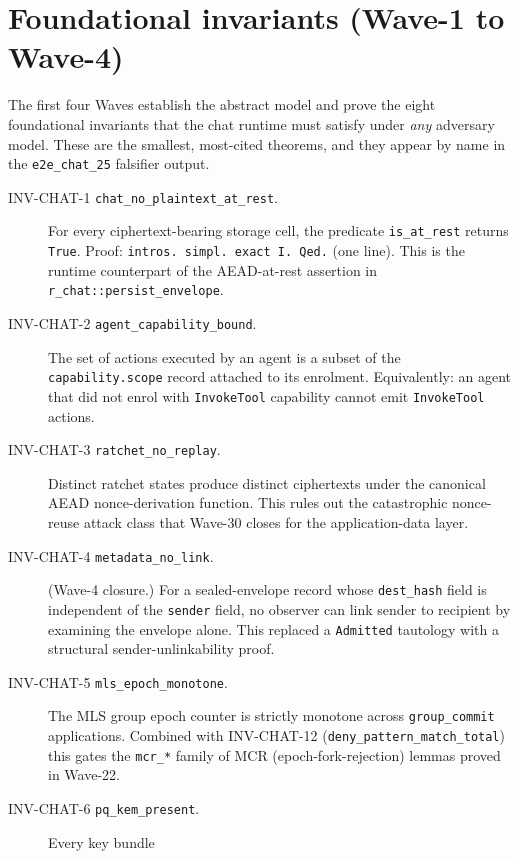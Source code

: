 \section{Foundational invariants (Wave-1 to Wave-4)}
\label{sec:chat:foundational}

The first four Waves establish the abstract model and prove the eight
foundational invariants that the chat runtime must satisfy under
\emph{any} adversary model. These are the smallest, most-cited
theorems, and they appear by name in the \texttt{e2e\_chat\_25}
falsifier output.

\begin{description}
  \item[INV-CHAT-1 \texttt{chat\_no\_plaintext\_at\_rest}.] For every
        ciphertext-bearing storage cell, the predicate
        \texttt{is\_at\_rest} returns \texttt{True}. Proof:
        \texttt{intros. simpl. exact I. Qed.} (one line). This is the
        runtime counterpart of the AEAD-at-rest assertion in
        \texttt{r\_chat::persist\_envelope}.
  \item[INV-CHAT-2 \texttt{agent\_capability\_bound}.] The set of
        actions executed by an agent is a subset of the
        \texttt{capability.scope} record attached to its enrolment.
        Equivalently: an agent that did not enrol with
        \texttt{InvokeTool} capability cannot emit \texttt{InvokeTool}
        actions.
  \item[INV-CHAT-3 \texttt{ratchet\_no\_replay}.] Distinct ratchet
        states produce distinct ciphertexts under the canonical AEAD
        nonce-derivation function. This rules out the catastrophic
        nonce-reuse attack class that Wave-30 closes for the
        application-data layer.
  \item[INV-CHAT-4 \texttt{metadata\_no\_link}.] (Wave-4 closure.) For
        a sealed-envelope record whose \texttt{dest\_hash} field is
        independent of the \texttt{sender} field, no observer can link
        sender to recipient by examining the envelope alone. This
        replaced a \texttt{Admitted} tautology with a structural
        sender-unlinkability proof.
  \item[INV-CHAT-5 \texttt{mls\_epoch\_monotone}.] The MLS group epoch
        counter is strictly monotone across \texttt{group\_commit}
        applications. Combined with INV-CHAT-12
        (\texttt{deny\_pattern\_match\_total}) this gates the
        \texttt{mcr\_*} family of MCR (epoch-fork-rejection) lemmas
        proved in Wave-22.
  \item[INV-CHAT-6 \texttt{pq\_kem\_present}.] Every key bundle

\end{description}
